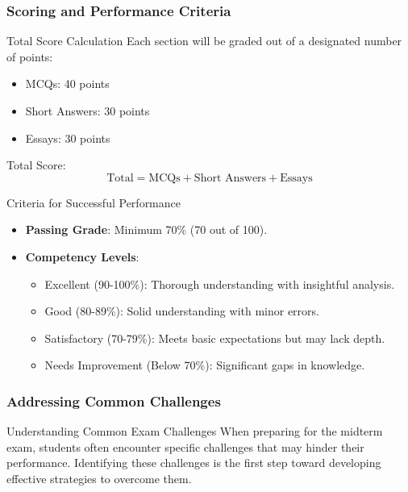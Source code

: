 \documentclass{beamer}
\begin{document}
\begin{frame}[fragile]
    \frametitle{Scoring and Performance Criteria}
    \begin{block}{Total Score Calculation}
        Each section will be graded out of a designated number of points:
        \begin{itemize}
            \item MCQs: 40 points
            \item Short Answers: 30 points
            \item Essays: 30 points
        \end{itemize}
        Total Score:
        \[
        \text{Total} = \text{MCQs} + \text{Short Answers} + \text{Essays}
        \]
    \end{block}

    \begin{block}{Criteria for Successful Performance}
        \begin{itemize}
            \item \textbf{Passing Grade}: Minimum 70\% (70 out of 100).
            \item \textbf{Competency Levels}:
                \begin{itemize}
                    \item Excellent (90-100\%): Thorough understanding with insightful analysis.
                    \item Good (80-89\%): Solid understanding with minor errors.
                    \item Satisfactory (70-79\%): Meets basic expectations but may lack depth.
                    \item Needs Improvement (Below 70\%): Significant gaps in knowledge.
                \end{itemize}
        \end{itemize}
    \end{block}
\end{frame}

\begin{frame}[fragile]
    \frametitle{Addressing Common Challenges}
    \begin{block}{Understanding Common Exam Challenges}
        When preparing for the midterm exam, students often encounter specific challenges that may hinder their performance. Identifying these challenges is the first step toward developing effective strategies to overcome them.
    \end{block}
\end{frame}
\end{document}
